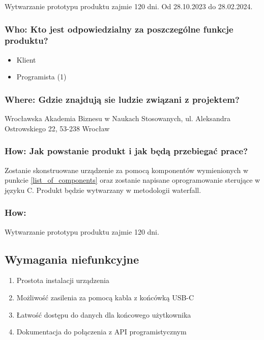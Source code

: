 \documentclass[12pt,a4paper]{article}
\begin{document}
Wytwarzanie prototypu produktu zajmie 120 dni. Od 28.10.2023 do 28.02.2024.

\subsubsection{Who: Kto jest odpowiedzialny za poszczególne funkcje produktu?}

\begin{itemize}
    \item Klient
    \item Programista (1)
\end{itemize}

\subsubsection{Where: Gdzie znajdują sie ludzie związani z projektem?}
Wrocławska Akademia Biznesu w Naukach Stosowanych, ul. Aleksandra Ostrowskiego 22, 53-238 Wrocław

\subsubsection{How: Jak powstanie produkt i jak będą przebiegać prace?}

Zostanie skonstruowane urządzenie za pomocą komponentów wymienionych w punkcie \ref{list_of_components} oraz zostanie napisane 
oprogramowanie sterujące w języku C. Produkt będzie wytwarzany w metodologii waterfall.

\subsubsection{How: }

Wytwarzanie prototypu produktu zajmie 120 dni.

\subsection{Wymagania niefunkcyjne}

\begin{enumerate}
    \item Prostota instalacji urządzenia
    \item Możliwość zasilenia za pomocą kabla z końcówką USB-C
    \item Łatwość dostępu do danych dla końcowego użytkownika
    \item Dokumentacja do połączenia z API programistycznym
\end{enumerate}
\end{document}
